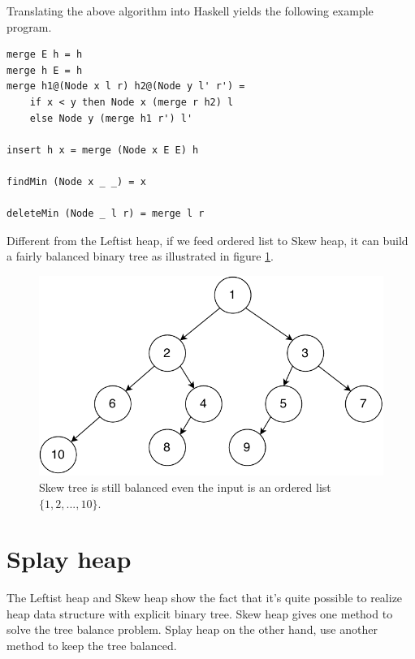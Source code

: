 \documentclass[b5paper]{article}
\begin{document}
Translating the above algorithm into Haskell yields the following
example program.

\lstset{language=Haskell}
\begin{lstlisting}
merge E h = h
merge h E = h
merge h1@(Node x l r) h2@(Node y l' r') =
    if x < y then Node x (merge r h2) l
    else Node y (merge h1 r') l'

insert h x = merge (Node x E E) h

findMin (Node x _ _) = x

deleteMin (Node _ l r) = merge l r
\end{lstlisting}

Different from the Leftist heap, if we feed ordered list to Skew heap, it can build a
fairly balanced binary tree as illustrated in figure \ref{fig:skew-tree}.

\begin{figure}[htbp]
   \begin{center}
   	  \includegraphics[scale=0.5]{img/skew-tree}
    \caption{Skew tree is still balanced even the input is an ordered list $\{1, 2, ..., 10\}$.}
    \label{fig:skew-tree}
   \end{center}
\end{figure}



\section{Splay heap}
\label{splayheap}

The Leftist heap and Skew heap show the fact that it's quite possible to realize
heap data structure with explicit binary tree.
Skew heap gives one method to solve the tree balance problem. Splay heap
on the other hand, use another method to keep the tree balanced.
\end{document}
